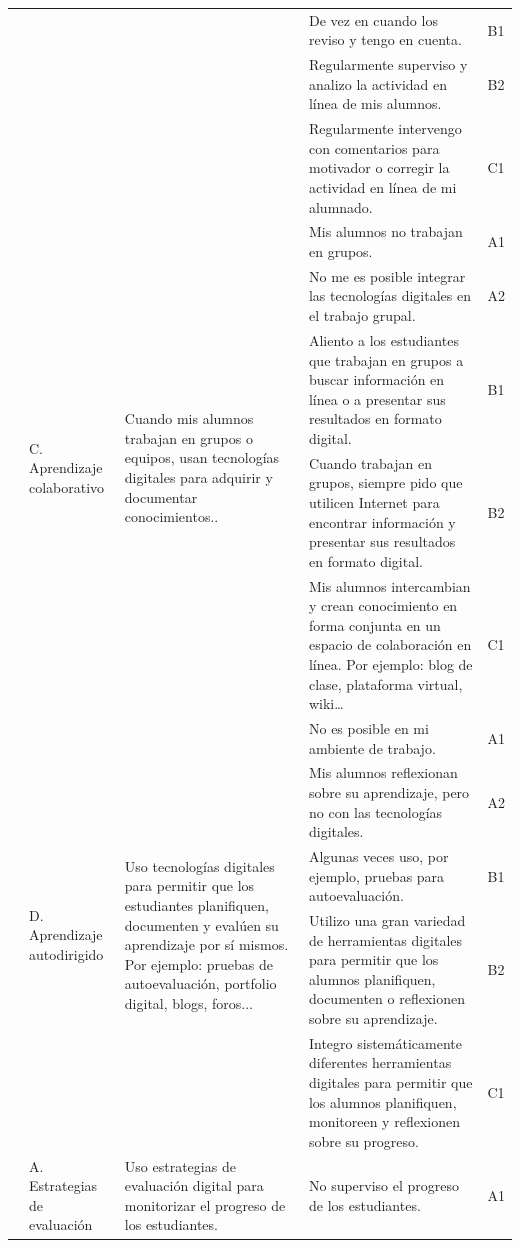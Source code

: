 \documentclass[spanish]{textolivre}
\begin{document}
\begin{small}
\begin{longtable}{
    >{\raggedright\arraybackslash}p{}
    p{}
    p{}
    p{}
    p{}
    }
\\
& & & De vez en cuando los reviso y tengo en cuenta. & B1
\\
& & & Regularmente superviso y analizo la actividad en línea de mis alumnos. & B2
\\
& & & Regularmente intervengo con comentarios para motivador o corregir la actividad en línea de mi alumnado. & C1
\\
\cmidrule{2-5}
& \multirow{5}{=}{C. Aprendizaje colaborativo} & \multirow{5}{=}{Cuando mis alumnos trabajan en grupos o equipos, usan tecnologías digitales para adquirir y documentar conocimientos..} & Mis alumnos no trabajan en grupos. & A1
\\
& & & No me es posible integrar las tecnologías digitales en el trabajo grupal. & A2
\\
& & & Aliento a los estudiantes que trabajan en grupos a buscar información en línea o a presentar sus resultados en formato digital. & B1
\\
& & & Cuando trabajan en grupos, siempre pido que utilicen Internet para encontrar información y presentar sus resultados en formato digital. & B2
\\
& & & Mis alumnos intercambian y crean conocimiento en forma conjunta en un espacio de colaboración en línea. Por ejemplo: blog de clase, plataforma virtual, wiki… & C1
\\
\cmidrule{2-5}
& \multirow{5}{=}{D. Aprendizaje autodirigido} & \multirow{5}{=}{Uso tecnologías digitales para permitir que los estudiantes planifiquen, documenten y evalúen su aprendizaje por sí mismos. Por ejemplo: pruebas de autoevaluación, portfolio digital, blogs, foros...} & No es posible en mi ambiente de trabajo. & A1
\\
& & & Mis alumnos reflexionan sobre su aprendizaje, pero no con las tecnologías digitales. & A2
\\
& & & Algunas veces uso, por ejemplo, pruebas para autoevaluación. & B1
\\
& & & Utilizo una gran variedad de herramientas digitales para permitir que los alumnos planifiquen, documenten o reflexionen sobre su aprendizaje. & B2
\\
& & & Integro sistemáticamente diferentes herramientas digitales para permitir que los alumnos planifiquen, monitoreen y reflexionen sobre su progreso. & C1
\\
\midrule
\multirow{15}{=}{4. Evaluación y retroalimentación} & \multirow{5}{=}{A. Estrategias de evaluación} & \multirow{5}{=}{Uso estrategias de evaluación digital para monitorizar el progreso de los estudiantes.} & No superviso el progreso de los estudiantes. & A1

\end{longtable}
\end{small}
\end{document}
